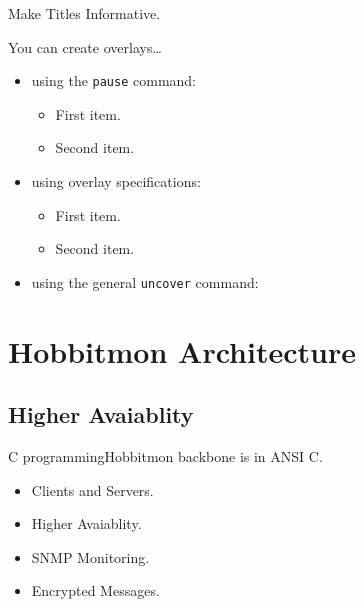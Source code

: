 \documentclass{beamer}
\begin{document}
\begin{frame}{Make Titles Informative.}

  You can create overlays\dots
  \begin{itemize}
  \item using the \texttt{pause} command:
    \begin{itemize}
    \item
      First item.
      \pause
    \item    
      Second item.
    \end{itemize}
  \item
    using overlay specifications:
    \begin{itemize}
    \item<3->
      First item.
    \item<4->
      Second item.
    \end{itemize}
  \item
    using the general \texttt{uncover} command:
    \begin{itemize}
    \end{itemize}
  \end{itemize}
\end{frame}





\section{Hobbitmon Architecture}

\subsection[Clients and Servers]{Higher Avaiablity}

\begin{frame}{C programming}{Hobbitmon backbone is in ANSI C.}

  \begin{itemize}
  \item
    Clients and Servers.
  \item
    Higher Avaiablity.
  \item
    SNMP Monitoring.
  \item
    Encrypted Messages. 
  \end{itemize}
\end{frame}
\end{document}
